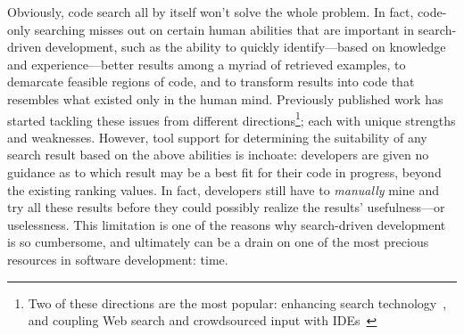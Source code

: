 Obviously, code search all by itself won't solve the whole problem. In fact, code-only searching misses out on certain human abilities that are important in search-driven development, such as the ability to quickly identify---based on knowledge and experience---better results among a myriad of retrieved examples, to demarcate feasible regions of code, and to transform results into code that resembles what existed only in the human mind. Previously published work has started tackling these issues from different directions\footnote{Two of these directions are the most popular: enhancing search technology~\cite{Bajracharya:2010um, Gysin:2010kt, McMillan:2011cm, McMillan:2012dj, Ying:2012tr}, and coupling Web search and crowdsourced input with IDEs~\cite{Bacchelli:2012dl, Brandt:2010tp, Hartmann:2010hx, Hoffmann:2007wo, Oney:2012ge, Wightman:2012gc}}; each with unique strengths and weaknesses. However, tool support for determining the suitability of any search result based on the above abilities is inchoate: developers are given no guidance as to which result may be a best fit for their code in progress, beyond the existing ranking values. In fact, developers still have to \emph{manually} mine and try all these results before they could possibly realize the results' usefulness---or uselessness. This limitation is one of the reasons why search-driven development is so cumbersome, and ultimately can be a drain on one of the most precious resources in software development: time.




